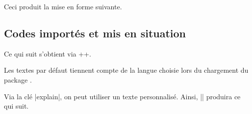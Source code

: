 

\begin{tdocexa}
    \leavevmode

    \begin{tdoclatex}[code]

    \end{tdoclatex}

    Ceci produit la mise en forme suivante.


\end{tdocexa}



\subsection{Codes importés et mis en situation} \label{tdoc-latexshow}

\begin{tdocexa}[Showcase]
    Ce qui suit s'obtient via \tdocinlatex++.

    \medskip

    \begin{tdoc-doc-showcase}

    \end{tdoc-doc-showcase}
\end{tdocexa}


\begin{tdocnote}
    Les textes par défaut tiennent compte de la langue choisie lors du chargement du package \thispack{}.
\end{tdocnote}




\begin{tdocexa}
    Via la clé \tdocinlatex|explain|, on peut utiliser un texte personnalisé. Ainsi, \tdocinlatex|| produira ce qui suit.

    \medskip

    \begin{tdoc-doc-showcase}

    \end{tdoc-doc-showcase}
\end{tdocexa}



